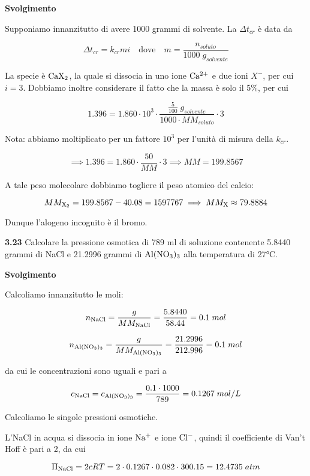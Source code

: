 \vspace{0.2cm}\large\textbf{Svolgimento}\normalsize

\vspace{0.2cm}Supponiamo innanzitutto di avere 1000 grammi di solvente. La $\Delta t_{cr}$ è data da

$$\Delta t_{cr}=k_{cr} m i
\quad\text{dove}\quad
m=\frac{n_{soluto}}{1000\;g_{solvente}}$$

La specie è $\rm CaX_2$, la quale si dissocia in uno ione $\rm Ca^{2+}$ e due ioni $X^-$, per cui $i=3$. Dobbiamo inoltre considerare il fatto che la massa è solo il 5\%, per cui

$$1.396=1.860 \cdot 10^3 \cdot \frac{\displaystyle \frac{5}{100}\;g_{solvente}}{1000 \cdot MM_{soluto}} \cdot 3$$

Nota: abbiamo moltiplicato per un fattore $10^3$ per l'unità di misura della $k_{cr}$.

$$\implies
1.396=1.860 \cdot \frac{50}{MM} \cdot 3
\implies
MM=199.8567$$

A tale peso molecolare dobbiamo togliere il peso atomico del calcio:

$$MM_{\rm X_2}=199.8567-40.08=1597767
\implies
MM_{\rm X} \approx 79.8884$$

Dunque l'alogeno incognito è il bromo.

\vspace{0.2cm}\textbf{3.23} Calcolare la pressione osmotica di 789 ml di soluzione contenente 5.8440 grammi di NaCl e  21.2996 grammi di $\rm Al(NO_3)_3$ alla temperatura di 27°C.

\vspace{0.2cm}\large\textbf{Svolgimento}\normalsize

\vspace{0.2cm}Calcoliamo innanzitutto le moli:

$$n_{\rm NaCl}=\frac{g}{MM_{\rm NaCl}}
=\frac{5.8440}{58.44}=0.1\;mol$$

$$n_{\rm Al(NO_3)_3}=\frac{g}{MM_{\rm Al(NO_3)_3}}
=\frac{21.2996}{212.996}=0.1\;mol$$

da cui le concentrazioni sono uguali e pari a

$$c_{\rm NaCl}=c_{\rm Al(NO_3)_3}=\frac{0.1 \cdot 1000}{789}
=0.1267\;mol/L$$

Calcoliamo le singole pressioni osmotiche.

L'NaCl in acqua si dissocia in ione $\rm Na^+$ e ione $\rm Cl^-$, quindi il coefficiente di Van't Hoff è pari a 2, da cui

$$\Pi_{\rm NaCl}=2cRT=2 \cdot 0.1267 \cdot 0.082 \cdot 300.15=12.4735\;atm$$

